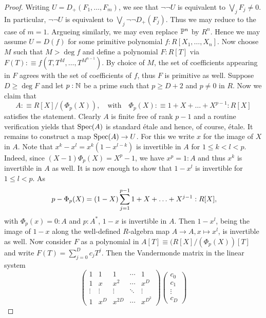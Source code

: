 \begin{proof}
  Writing $U = D_+(F_1, \hdots, F_m)$, we see that $\neg\neg U$ is equivalent to $\bigvee_j F_j \neq 0$.
  In particular, $\neg\neg U$ is equivalent to $\bigvee_j \neg\neg D_+(F_j)$.
  Thus we may reduce to the case of $m=1$.
  Argueing similarly, we may even replace $\mathbb{P}^n$ by $R^n$.
  Hence we may assume $U = D(f)$ for some primitive polynomial $f : R[X_1, \hdots, X_n]$.
  Now choose $M$ such that $M > \deg f$ and define a polynomial $F : R[T]$ via $F(T) : \equiv f(T, T^M, \hdots, T^{M^{n-1}})$.
  By choice of $M$, the set of coefficients appearing in $F$ agrees with the set of coefficients of $f$, thus $F$ is primitive as well.
  Suppose $D \geq \deg F$ and let $p:\mathbb N$ be a prime such that $p \geq D + 2$ and $p \neq 0$ in $R$.
  Now we claim that
  \[
    A :\equiv R[X]/(\Phi_p(X)),
    \quad \text{with} \quad
    \Phi_p(X) :\equiv 1 + X + \hdots + X^{p-1} : R[X]
  \]
  satisfies the statement.
  Clearly $A$ is finite free of rank $p - 1$ and a routine verification yields that $\operatorname{Spec}(A)$ is standard étale and hence, of course, étale.
  It remains to construct a map $\operatorname{Spec}(A) \to U$.
  For this we write $x$ for the image of $X$ in $A$.
  Note that $x^k - x^l = x^k(1-x^{l-k})$ is invertible in $A$ for $1 \leq k < l < p$.
  Indeed, since $(X-1)\Phi_p(X) = X^p-1$, we have $x^p = 1 : A$ and thus $x^k$ is invertible in $A$ as well.
  It is now enough to show that $1 - x^l$ is invertible for $1 \leq l < p$.
  As
  \[
    p - \Phi_p(X) = (1 - X) \sum_{j=1}^{p-1} 1 + X + \hdots + X^{j-1} : R[X] \rlap{,}
  \]
  with $\Phi_p(x) = 0 : A$ and $p : A^\ast$, $1-x$ is invertible in $A$.
  Then $1-x^l$, being the image of $1-x$ along the well-defined $R$-algebra map $A \to A, x \mapsto x^l$, is invertible as well.
  Now consider $F$ as a polynomial in $A[T] \equiv (R[X]/(\Phi_p(X))[T]$ and write $F(T) = \sum_{j=0}^{D} c_jT^j$.
  Then the Vandermonde matrix in the linear system
  \[
    \begin{pmatrix}
      1 & 1 & 1 & \cdots & 1 \\
      1 & x & x^2 & \cdots & x^D \\
      \vdots & \vdots & \vdots & \ddots & \vdots\\
      1 & x^D & x^{2D} & \cdots & x^{D^2}
      \end{pmatrix}
      \begin{pmatrix}
      c_0\\
      c_1\\
      \vdots\\
      c_D
    \end{pmatrix}
\]
\end{proof}
